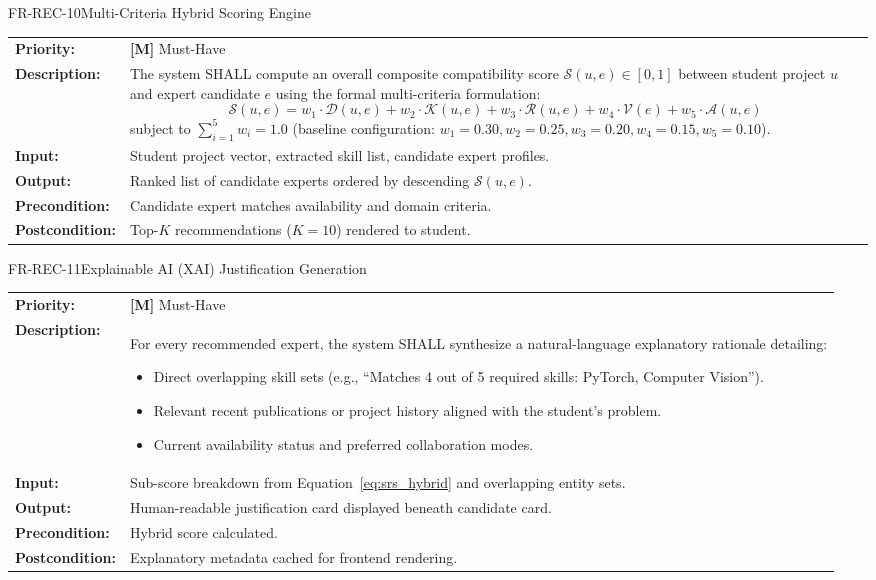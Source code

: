 \documentclass[11pt,a4paper]{article}
\begin{document}
\begin{reqbox}{FR-REC-10}{Multi-Criteria Hybrid Scoring Engine}
\begin{tabularx}{\textwidth}{@{}lX@{}}
\textbf{Priority:} & \textbf{[M]} Must-Have \\
\textbf{Description:} & The system SHALL compute an overall composite compatibility score $\mathcal{S}(u, e) \in [0, 1]$ between student project $u$ and expert candidate $e$ using the formal multi-criteria formulation:
\begin{equation}
    \label{eq:srs_hybrid}
    \mathcal{S}(u, e) = w_1 \cdot \mathcal{D}(u, e) + w_2 \cdot \mathcal{K}(u, e) + w_3 \cdot \mathcal{R}(u, e) + w_4 \cdot \mathcal{V}(e) + w_5 \cdot \mathcal{A}(u, e)
\end{equation}
subject to $\sum_{i=1}^5 w_i = 1.0$ (baseline configuration: $w_1=0.30, w_2=0.25, w_3=0.20, w_4=0.15, w_5=0.10$). \\
\textbf{Input:} & Student project vector, extracted skill list, candidate expert profiles. \\
\textbf{Output:} & Ranked list of candidate experts ordered by descending $\mathcal{S}(u, e)$. \\
\textbf{Precondition:} & Candidate expert matches availability and domain criteria. \\
\textbf{Postcondition:} & Top-$K$ recommendations ($K=10$) rendered to student. \\
\end{tabularx}
\end{reqbox}

\begin{reqbox}{FR-REC-11}{Explainable AI (XAI) Justification Generation}
\begin{tabularx}{\textwidth}{@{}lX@{}}
\textbf{Priority:} & \textbf{[M]} Must-Have \\
\textbf{Description:} & For every recommended expert, the system SHALL synthesize a natural-language explanatory rationale detailing:
\begin{itemize}[noitemsep]
    \item Direct overlapping skill sets (e.g., ``Matches 4 out of 5 required skills: PyTorch, Computer Vision'').
    \item Relevant recent publications or project history aligned with the student's problem.
    \item Current availability status and preferred collaboration modes.
\end{itemize} \\
\textbf{Input:} & Sub-score breakdown from Equation~\ref{eq:srs_hybrid} and overlapping entity sets. \\
\textbf{Output:} & Human-readable justification card displayed beneath candidate card. \\
\textbf{Precondition:} & Hybrid score calculated. \\
\textbf{Postcondition:} & Explanatory metadata cached for frontend rendering. \\
\end{tabularx}
\end{reqbox}
\end{document}
